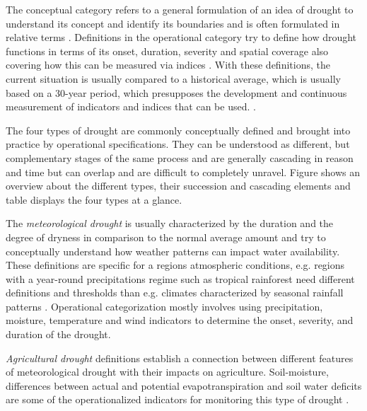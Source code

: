 {The conceptual category refers to a general formulation of an idea of drought to understand its concept and identify its boundaries and is often formulated in relative terms \autocite{wilhiteUnderstandingDroughtPhenomenon1985}. Definitions in the operational category try to define how drought functions in terms of its onset, duration, severity and spatial coverage also covering how this can be measured via indices \autocite{balintMonitoringDroughtCombined2013, nationaldroughtmitigationcenterWhatDrought, wilhiteUnderstandingDroughtPhenomenon1985}. With these definitions, the current situation is usually compared to a historical average, which is usually based on a 30-year period, which presupposes the development and continuous measurement of indicators and indices that can be used. \autocite{vereintenationenSpecialReportDrought2021,wilhiteUnderstandingDroughtPhenomenon1985}.

The four types of drought are commonly conceptually defined and brought into practice by operational specifications. They can be understood as different, but complementary stages of the same process and are generally cascading in reason and time but can overlap and are difficult to completely unravel. Figure  shows an overview about the different types, their succession and cascading elements and table  displays the four types at a glance.


The \textit{meteorological drought} is usually characterized by the duration and the degree of dryness in comparison to the normal average amount and try to conceptually understand how weather patterns can impact water availability. These definitions are specific for a regions atmospheric conditions, e.g. regions with a year-round precipitations regime such as tropical rainforest need different definitions and thresholds than e.g. climates characterized by seasonal rainfall patterns \autocite{nationaldroughtmitigationcenterTypesDrought}. Operational categorization mostly involves using precipitation, moisture, temperature and wind indicators to determine the onset, severity, and duration of the drought.

\textit{Agricultural drought} definitions establish a connection between different features of meteorological drought with their impacts on agriculture. Soil-moisture, differences between actual and potential evapotranspiration and soil water deficits are some of the operationalized indicators for monitoring this type of drought \autocite{baltiReviewDroughtMonitoring2020,nationaldroughtmitigationcenterTypesDrought,wilhiteUnderstandingDroughtPhenomenon1985}.

}
